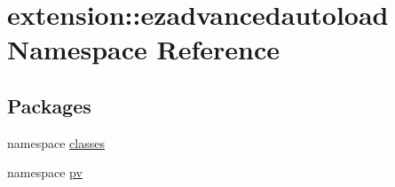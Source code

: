 \hypertarget{namespaceextension_1_1ezadvancedautoload}{\section{extension\-:\-:ezadvancedautoload \-Namespace \-Reference}
\label{namespaceextension_1_1ezadvancedautoload}
}
\subsection*{\-Packages}
\begin{DoxyCompactItemize}
\item 
namespace \hyperlink{namespaceextension_1_1ezadvancedautoload_1_1classes}{classes}
\item 
namespace \hyperlink{namespaceextension_1_1ezadvancedautoload_1_1pv}{pv}
\end{DoxyCompactItemize}
